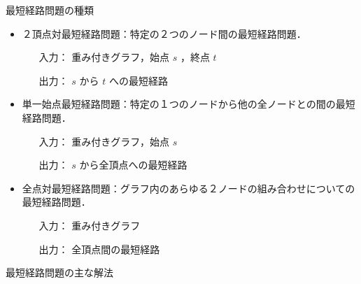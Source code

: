 \documentclass[12pt]{optlab-bachelor}
\begin{document}
\begin{description}
  \item[最短経路問題の種類]
\end{description}
\begin{itemize}
\item ２頂点対最短経路問題：特定の２つのノード間の最短経路問題．
\begin{itemize}
  \item[入力：]重み付きグラフ，始点 $s$ ，終点 $t$
  \item[出力：] $s$ から $t$ への最短経路
\end{itemize}
\item 単一始点最短経路問題：特定の１つのノードから他の全ノードとの間の最短経路問題．
\begin{itemize}
  \item[入力：]重み付きグラフ，始点 $s$
  \item[出力：] $s$ から全頂点への最短経路
\end{itemize}
\item 全点対最短経路問題：グラフ内のあらゆる２ノードの組み合わせについての最短経路問題．
\begin{itemize}
  \item[入力：]重み付きグラフ
  \item[出力：]全頂点間の最短経路
\end{itemize}
\end{itemize}
\begin{description}
  \item[最短経路問題の主な解法]
\end{description}
\end{document}
